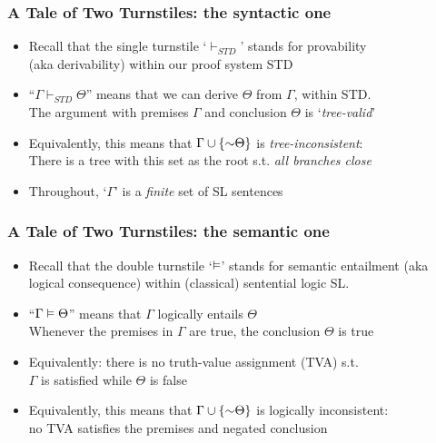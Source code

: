 \begin{frame}
\frametitle{A Tale of Two Turnstiles: the syntactic one}

\begin{itemize}[<+->]

\item Recall that the single turnstile `$\vdash_{STD}$' stands for provability \\ (aka derivability) within our proof system STD

\item ``$\Gamma \vdash_{STD} \Theta$'' means that we can derive $\Theta$ from $\Gamma$, within STD. \\ The argument with premises $\Gamma$ and conclusion $\Theta$ is `\emph{tree-valid}'

\item Equivalently, this means that $\Gamma \cup \{\enot \Theta\}$ is \emph{tree-inconsistent}: \\ There is a tree with this set as the root s.t. \emph{all branches close}

\item Throughout, `$\Gamma$' is a \textit{finite} set of SL sentences

\end{itemize}
\end{frame}

\begin{frame}
\frametitle{A Tale of Two Turnstiles: the semantic one}

\begin{itemize}[<+->]

\item Recall that the double turnstile `$\vDash$' stands for semantic entailment (aka logical consequence) within (classical) sentential logic SL. 

\item ``$\Gamma \vDash \Theta$'' means that $\Gamma$ logically entails $\Theta$ \\ Whenever the premises in $\Gamma$ are true, the conclusion $\Theta$ is true 

\item Equivalently: there is no truth-value assignment (TVA) s.t. \\ $\Gamma$ is satisfied while $\Theta$ is false

\item Equivalently, this means that $\Gamma \cup \{\enot \Theta\}$ is logically inconsistent: \\ no TVA satisfies the premises and negated conclusion  

\end{itemize}
\end{frame}



